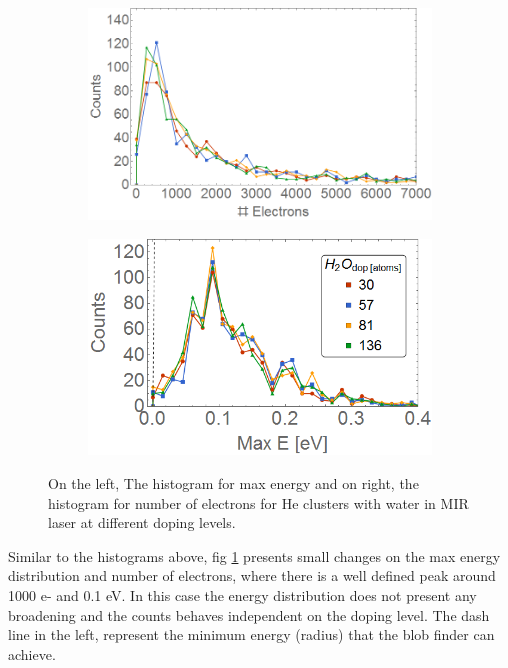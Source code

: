 \begin{figure}[h!]
\centering
\begin{subfigure}[l]{0.49\textwidth}
\includegraphics[width=1\textwidth]{../Images/results/MIR_He_waterDop/Helec.png} 
\end{subfigure}
\begin{subfigure}[l]{0.49\textwidth}
\includegraphics[width=1\textwidth]{../Images/results/MIR_He_waterDop/Heberg.png}   				\end{subfigure}
\caption[MIR He_Water. Histograms]{On the left, The histogram for max energy and on right, the histogram for number of electrons for He clusters with water in MIR laser at different doping levels.}
\label{fig:histowaterdop}
\end{figure}

Similar to the histograms above, fig \ref{fig:histowaterdop} presents small changes on the max energy distribution and number of electrons, where there is a well defined peak around 1000 e- and 0.1 eV. In this case the energy distribution does not present any broadening and the counts behaves independent on the doping level. The dash line in the left, represent the minimum energy (radius) that the blob finder can achieve.

